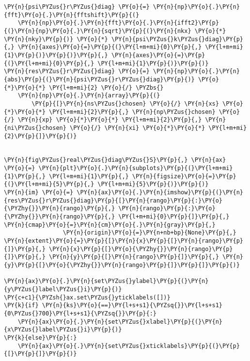 \begin{Verbatim}[commandchars=\\\{\}]
\PY{n}{psi\PYZus{}r\PYZus{}diag} \PY{o}{=} \PY{n}{np}\PY{o}{.}\PY{n}{fft}\PY{o}{.}\PY{n}{fftshift}\PY{p}{(}
    \PY{n}{np}\PY{o}{.}\PY{n}{fft}\PY{o}{.}\PY{n}{ifft2}\PY{p}{(}\PY{n}{np}\PY{o}{.}\PY{n}{sqrt}\PY{p}{(}\PY{n}{nkx} \PY{o}{*} \PY{n}{nky}\PY{p}{)} \PY{o}{*} \PY{n}{psi\PYZus{}k\PYZus{}diag}\PY{p}{,} \PY{n}{axes}\PY{o}{=}\PY{p}{(}\PY{l+m+mi}{0}\PY{p}{,} \PY{l+m+mi}{1}\PY{p}{)}\PY{p}{)}\PY{p}{,} \PY{n}{axes}\PY{o}{=}\PY{p}{(}\PY{l+m+mi}{0}\PY{p}{,} \PY{l+m+mi}{1}\PY{p}{)}\PY{p}{)}
\PY{n}{res\PYZus{}r\PYZus{}diag} \PY{o}{=} \PY{n}{np}\PY{o}{.}\PY{n}{abs}\PY{p}{(}\PY{n}{psi\PYZus{}r\PYZus{}diag}\PY{p}{)} \PY{o}{*}\PY{o}{*} \PY{l+m+mi}{2} \PY{o}{/} \PYZbs{}
    \PY{n}{np}\PY{o}{.}\PY{n}{array}\PY{p}{(}
        \PY{p}{[}\PY{n}{ns\PYZus{}chosen} \PY{o}{/} \PY{n}{xs} \PY{o}{*}\PY{o}{*} \PY{l+m+mi}{2}\PY{p}{,} \PY{n}{np\PYZus{}chosen} \PY{o}{/} \PY{n}{xp} \PY{o}{*}\PY{o}{*} \PY{l+m+mi}{2}\PY{p}{,} \PY{n}{ni\PYZus{}chosen} \PY{o}{/} \PY{n}{xi} \PY{o}{*}\PY{o}{*} \PY{l+m+mi}{2}\PY{p}{]}\PY{p}{)}


\PY{n}{fig\PYZus{}real\PYZus{}diag\PYZus{}S}\PY{p}{,} \PY{n}{ax} \PY{o}{=} \PY{n}{plt}\PY{o}{.}\PY{n}{subplots}\PY{p}{(}\PY{l+m+mi}{1}\PY{p}{,} \PY{l+m+mi}{1}\PY{p}{,} \PY{n}{figsize}\PY{o}{=}\PY{p}{(}\PY{l+m+mi}{5}\PY{p}{,} \PY{l+m+mi}{5}\PY{p}{)}\PY{p}{)}
\PY{n}{im} \PY{o}{=} \PY{n}{ax}\PY{o}{.}\PY{n}{imshow}\PY{p}{(}\PY{n}{res\PYZus{}r\PYZus{}diag}\PY{p}{[}\PY{n}{rango}\PY{p}{:}\PY{o}{\PYZhy{}}\PY{n}{rango}\PY{p}{,} \PY{n}{rango}\PY{p}{:}\PY{o}{\PYZhy{}}\PY{n}{rango}\PY{p}{,} \PY{l+m+mi}{0}\PY{p}{]}\PY{p}{,} \PY{n}{cmap}\PY{o}{=}\PY{n}{cm}\PY{o}{.}\PY{n}{gray}\PY{p}{,}
                 \PY{n}{origin}\PY{o}{=}\PY{n+nb+bp}{None}\PY{p}{,} \PY{n}{extent}\PY{o}{=}\PY{p}{[}\PY{n}{x}\PY{p}{[}\PY{n}{rango}\PY{p}{]}\PY{p}{,} \PY{n}{x}\PY{p}{[}\PY{o}{\PYZhy{}}\PY{n}{rango}\PY{p}{]}\PY{p}{,} \PY{n}{y}\PY{p}{[}\PY{n}{rango}\PY{p}{]}\PY{p}{,} \PY{n}{y}\PY{p}{[}\PY{o}{\PYZhy{}}\PY{n}{rango}\PY{p}{]}\PY{p}{]}\PY{p}{)}

\PY{n}{ax}\PY{o}{.}\PY{n}{set\PYZus{}ylabel}\PY{p}{(}\PY{n}{y\PYZus{}label\PYZus{}i}\PY{p}{)}
\PY{c+c1}{\PYZsh{}ax.set\PYZus{}yticklabels([])}
\PY{k}{if} \PY{n}{ks}\PY{o}{==}\PY{l+s+s1}{\PYZsq{}}\PY{l+s+s1}{0\PYZus{}700}\PY{l+s+s1}{\PYZsq{}}\PY{p}{:}
    \PY{n}{ax}\PY{o}{.}\PY{n}{set\PYZus{}xlabel}\PY{p}{(}\PY{n}{x\PYZus{}label\PYZus{}i}\PY{p}{)}
\PY{k}{else}\PY{p}{:}
    \PY{n}{ax}\PY{o}{.}\PY{n}{set\PYZus{}xticklabels}\PY{p}{(}\PY{p}{[}\PY{p}{]}\PY{p}{)}


\end{Verbatim}
